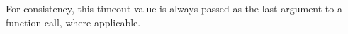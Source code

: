 For consistency, this timeout value is always passed as the last argument to
a function call, where applicable.




























